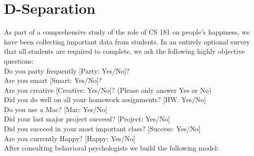 \documentclass[11pt,letterpaper]{article}
\begin{document}
\section{D-Separation}
As part of a comprehensive study of the role of CS 181 on people's happiness, we have been collecting important data from students. In an entirely optional survey that all students are required to complete, we ask the following highly objective questions: \\

Do you party frequently [Party: Yes/No]? \\
\indent Are you  smart [Smart: Yes/No]? \\
\indent Are you creative [Creative: Yes/No]? (Please only answer Yes or No) \\
\indent Did you do well on all your homework assignments? [HW: Yes/No] \\
\indent Do you use a Mac? [Mac: Yes/No] \\
\indent Did your last major project succeed? [Project: Yes/No] \\
\indent Did you succeed in your most important class? [Success: Yes/No] \\
\indent Are you currently Happy? [Happy: Yes/No] \\

After consulting behavioral psychologists we build the following model:

\begin{figure}[htp]
 
\begin{center}
\end{center}
\end{figure}
\end{document}
